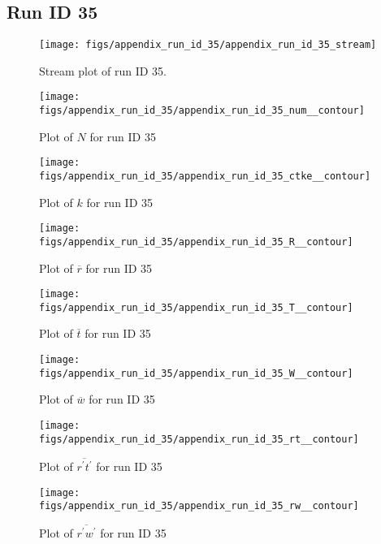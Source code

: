 \subsection{Run ID 35}
\begin{figure}[H]
\centering
\texttt{[image: figs/appendix\_run\_id\_35/appendix\_run\_id\_35\_stream]}
\caption{Stream plot of run ID 35.}
\label{fig:appendix_run_id_35_stream}
\end{figure}


\begin{figure}[H]
\centering
\texttt{[image: figs/appendix\_run\_id\_35/appendix\_run\_id\_35\_num\_\_contour]}
\caption{Plot of $N$ for run ID 35}
\label{fig:appendix_run_id_35_num__contour}
\end{figure}


\begin{figure}[H]
\centering
\texttt{[image: figs/appendix\_run\_id\_35/appendix\_run\_id\_35\_ctke\_\_contour]}
\caption{Plot of $k$ for run ID 35}
\label{fig:appendix_run_id_35_ctke__contour}
\end{figure}


\begin{figure}[H]
\centering
\texttt{[image: figs/appendix\_run\_id\_35/appendix\_run\_id\_35\_R\_\_contour]}
\caption{Plot of $\overline{r}$ for run ID 35}
\label{fig:appendix_run_id_35_R__contour}
\end{figure}


\begin{figure}[H]
\centering
\texttt{[image: figs/appendix\_run\_id\_35/appendix\_run\_id\_35\_T\_\_contour]}
\caption{Plot of $\overline{t}$ for run ID 35}
\label{fig:appendix_run_id_35_T__contour}
\end{figure}


\begin{figure}[H]
\centering
\texttt{[image: figs/appendix\_run\_id\_35/appendix\_run\_id\_35\_W\_\_contour]}
\caption{Plot of $\overline{w}$ for run ID 35}
\label{fig:appendix_run_id_35_W__contour}
\end{figure}


\begin{figure}[H]
\centering
\texttt{[image: figs/appendix\_run\_id\_35/appendix\_run\_id\_35\_rt\_\_contour]}
\caption{Plot of $\overline{r^\prime t^\prime}$ for run ID 35}
\label{fig:appendix_run_id_35_rt__contour}
\end{figure}


\begin{figure}[H]
\centering
\texttt{[image: figs/appendix\_run\_id\_35/appendix\_run\_id\_35\_rw\_\_contour]}
\caption{Plot of $\overline{r^\prime w^\prime}$ for run ID 35}
\label{fig:appendix_run_id_35_rw__contour}
\end{figure}


